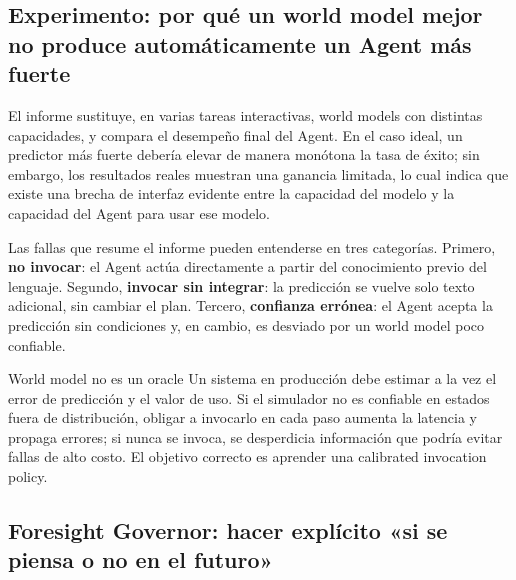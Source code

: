 \subsection{Experimento: por qué un world model mejor no produce automáticamente un Agent más fuerte}

El informe sustituye, en varias tareas interactivas, world models con distintas capacidades, y compara el desempeño final del Agent. En el caso ideal, un predictor más fuerte debería elevar de manera monótona la tasa de éxito; sin embargo, los resultados reales muestran una ganancia limitada, lo cual indica que existe una brecha de interfaz evidente entre la capacidad del modelo y la capacidad del Agent para usar ese modelo.




Las fallas que resume el informe pueden entenderse en tres categorías. Primero, \textbf{no invocar}: el Agent actúa directamente a partir del conocimiento previo del lenguaje. Segundo, \textbf{invocar sin integrar}: la predicción se vuelve solo texto adicional, sin cambiar el plan. Tercero, \textbf{confianza errónea}: el Agent acepta la predicción sin condiciones y, en cambio, es desviado por un world model poco confiable.

\begin{warningbox}{World model no es un oracle}
Un sistema en producción debe estimar a la vez el error de predicción y el valor de uso. Si el simulador no es confiable en estados fuera de distribución, obligar a invocarlo en cada paso aumenta la latencia y propaga errores; si nunca se invoca, se desperdicia información que podría evitar fallas de alto costo. El objetivo correcto es aprender una calibrated invocation policy.
\end{warningbox}

\subsection{Foresight Governor: hacer explícito «si se piensa o no en el futuro»}

